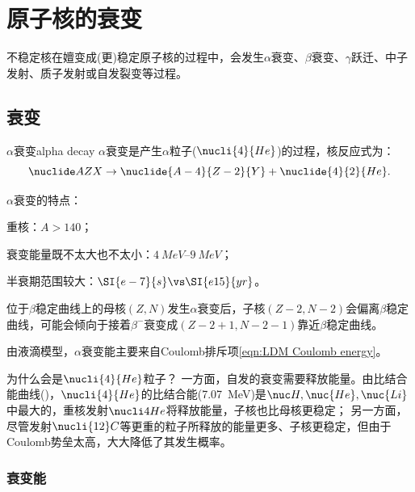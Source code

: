 \chapter{原子核的衰变}
不稳定核在嬗变成(更)稳定原子核的过程中，会发生$\alpha$衰变、$\beta$衰变、$\gamma$跃迁、中子发射、质子发射或自发裂变等过程。

\section{\textalpha 衰变}

\begin{definition}
	{$\alpha$衰变}{alpha decay}
	$\alpha$衰变是产生$\alpha$粒子($\nucli{4}{He}$)的过程，核反应式为：
	\begin{equation}
		\nuclide AZX \to \nuclide{A-4}{Z-2}{Y} + \nuclide{4}{2}{He}.
	\end{equation}
\end{definition}

\begin{remark}
	$\alpha$衰变的特点：
	\begin{compactenum}
		\item 重核：$A>140$；
		\item 衰变能量既不太大也不太小：$\SIrange{4}{9}{MeV}$；
		\item 半衰期范围较大：$\SI{e-7}{s}\vs\SI{e15}{yr}$。
		\item 位于$\beta$稳定曲线上的母核$(Z,N)$发生$\alpha$衰变后，子核$(Z-2,N-2)$会偏离$\beta$稳定曲线，可能会倾向于接着$\beta^-$衰变成$(Z-2+1,N-2-1)$靠近$\beta$稳定曲线。
	\end{compactenum}
\end{remark}

\begin{corollary}
	由液滴模型，$\alpha$衰变能主要来自Coulomb排斥项\eqref{eqn:LDM Coulomb energy}。
\end{corollary}

\begin{remark}
	为什么会是$\nucli{4}{He}$粒子？
	一方面，自发的衰变需要释放能量。由比结合能曲线()，$\nucli{4}{He}$的比结合能(\SI{7.07}{MeV})是$\nuc H,\nuc{He},\nuc{Li}$中最大的，重核发射$\nucli4{He}$将释放能量，子核也比母核更稳定；
	另一方面，尽管发射$\nucli{12}C$等更重的粒子所释放的能量更多、子核更稳定，但由于Coulomb势垒太高，大大降低了其发生概率。
\end{remark}

\subsection{\textalpha 衰变能}

